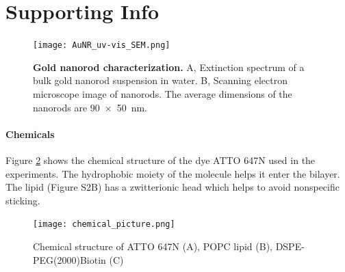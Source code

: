 \graphicspath{{chapters/c2_bilayer_efcs/si-figure/}}

\section{Supporting Info}
\begin{figure}%
  \centering
  \texttt{[image: AuNR\_uv-vis\_SEM.png]}
  \makeatletter
  \renewcommand{\fnum@figure}{\figurename~S\thefigure}
  \makeatother
  \caption{\textbf{Gold nanorod characterization.} A, Extinction spectrum of a bulk gold nanorod suspension in water. B, Scanning electron microscope image of nanorods.
  The average dimensions of the nanorods are \SI[product-units=repeat]{90x50}{\nm}.}
  \label{SIfig: AuNR_uv-vis}
\end{figure}

\paragraph*{Chemicals}
Figure \ref{SIfig:chemical} shows the chemical structure of the dye ATTO 647N used in the experiments.
The hydrophobic moiety of the molecule helps it enter the bilayer.
The lipid (Figure S2B) has a zwitterionic head which helps to avoid nonspecific sticking.
\begin{figure}%
  \centering
  \texttt{[image: chemical\_picture.png]}
  \makeatletter
  \renewcommand{\fnum@figure}{\figurename~S\thefigure}
  \makeatother{}
  \caption{Chemical structure of ATTO 647N (A), POPC lipid (B), DSPE-PEG(2000)Biotin (C)}
  \label{SIfig:chemical}
\end{figure}

